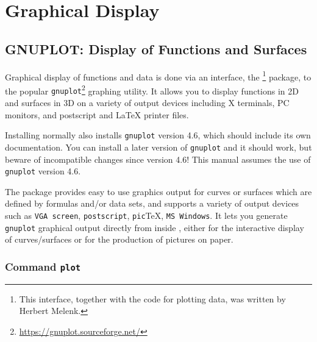 \chapter{Graphical Display}


\section{GNUPLOT: Display of Functions and Surfaces}
\label{package:GNUPLOT}
\newcommand{\Gnuplot}{\texttt{gnuplot}}

Graphical display of functions and data is done via an interface, the
{\REDUCE} \footnote{This interface, together with the
code for plotting data, was written by Herbert Melenk.} package, to
the popular
{\Gnuplot}\footnote{\url{https://gnuplot.sourceforge.net/}} graphing
utility.  It allows you to display functions in 2D and surfaces in 3D
on a variety of output devices including X terminals, PC monitors, and
postscript and {\LaTeX} printer files.

Installing {\REDUCE} normally also installs {\Gnuplot} version 4.6,
which should include its own documentation.  You can install a later
version of {\Gnuplot} and it should work, but beware of incompatible
changes since version 4.6!  This manual assumes the use of {\Gnuplot}
version 4.6.

The  package provides easy to use graphics output for
curves or surfaces which are defined by formulas and/or data sets, and
supports a variety of output devices such as \texttt{VGA screen},
\texttt{postscript}, \texttt{pic}\TeX, \texttt{MS Windows}.  It lets
you generate {\Gnuplot} graphical output directly from inside
{\REDUCE}, either for the interactive display of curves/surfaces or
for the production of pictures on paper.

\subsection{Command \texttt{plot}}
\hypertarget{command:PLOT}{}


